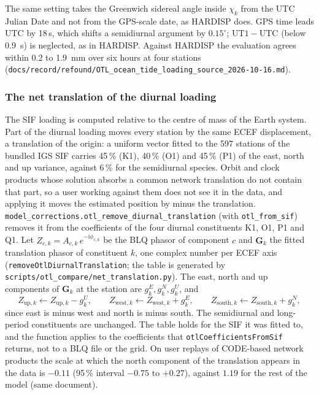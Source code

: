 \documentclass[main.tex]{subfiles}
\begin{document}
The same setting takes the Greenwich sidereal angle inside $\chi_k$ from
the UTC Julian Date and not from the GPS-scale date, as HARDISP does.
GPS time leads UTC by 18\,s, which shifts a semidiurnal argument by
$0.15^\circ$; $\mathrm{UT1}-\mathrm{UTC}$ (below \SI{0.9}{\second}) is
neglected, as in HARDISP.  Against HARDISP the evaluation agrees within
0.2 to \SI{1.9}{\milli\metre} over six hours at four stations
(\texttt{docs/record/refound/OTL\_ocean\_tide\_loading\_source\_2026-10-16.md}).

\subsubsection{The net translation of the diurnal loading}
\label{sec:sitedisp-otl-trans}

The SIF loading is computed relative to the centre of mass of the Earth
system.  Part of the diurnal loading moves every station by the same
ECEF displacement, a translation of the origin: a uniform vector fitted
to the 597 stations of the bundled IGS SIF carries 45\,\% (K1), 40\,\%
(O1) and 45\,\% (P1) of the east, north and up variance, against 6\,\%
for the semidiurnal species.  Orbit and clock products whose solution
absorbs a common network translation do not contain that part, so a user
working against them does not see it in the data, and applying it moves
the estimated position by minus the translation.
\texttt{model\_corrections.otl\_remove\_diurnal\_translation} (with
\texttt{otl\_from\_sif}) removes it from the coefficients of the four
diurnal constituents K1, O1, P1 and Q1.  Let $Z_{c,k} = A_{c,k}\,e^{-\mathrm{i}\phi_{c,k}}$
be the BLQ phasor of component $c$ and $\bm{G}_k$ the fitted translation
phasor of constituent $k$, one complex number per ECEF axis
(\texttt{removeOtlDiurnalTranslation}; the table is generated by
\texttt{scripts/otl\_compare/net\_translation.py}).  The east, north and up
components of $\bm{G}_k$ at the station are
$g^{E}_k,g^{N}_k,g^{U}_k$, and
\begin{equation}
Z_{\mathrm{up},k}\leftarrow Z_{\mathrm{up},k}-g^{U}_k,
\qquad
Z_{\mathrm{west},k}\leftarrow Z_{\mathrm{west},k}+g^{E}_k,
\qquad
Z_{\mathrm{south},k}\leftarrow Z_{\mathrm{south},k}+g^{N}_k,
\label{eq:sitedisp-otl-trans}
\end{equation}
since east is minus west and north is minus south.  The semidiurnal and
long-period constituents are unchanged.  The table holds for the SIF it
was fitted to, and the function applies to the coefficients that
\texttt{otlCoefficientsFromSif} returns, not to a BLQ file or the grid.
On user replays of CODE-based network products the scale at which
the north component of the translation appears in the data is $-0.11$
(95\,\% interval $-0.75$ to $+0.27$), against $1.19$ for the rest of the
model (same document).
\end{document}
